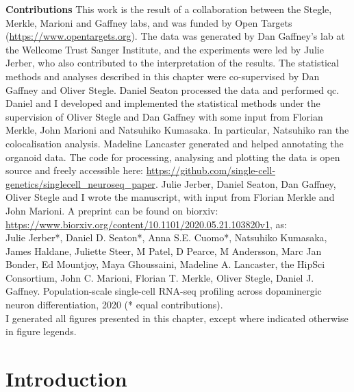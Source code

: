 \newpage

\begin{Comment2}

\hspace{-3mm}\textbf{Contributions} This work is the result of a collaboration between the Stegle, Merkle, Marioni and Gaffney labs, and was funded by Open Targets 
(\url{https://www.opentargets.org}).
The data was generated by Dan Gaffney’s lab at the Wellcome Trust Sanger Institute, and the experiments were led by Julie Jerber, who also contributed to the interpretation of the results. 
The statistical methods and analyses described in this chapter were co-supervised by Dan Gaffney and Oliver Stegle. 
Daniel Seaton processed the data and performed \gls{qc}. 
Daniel and I developed and implemented the statistical methods under the supervision of Oliver Stegle and Dan Gaffney with some input from Florian Merkle, John Marioni and Natsuhiko Kumasaka.
In particular, Natsuhiko ran the colocalisation analysis.
Madeline Lancaster generated and helped annotating the organoid data.
The code for processing, analysing and plotting the data is open source and freely accessible here: \url{https://github.com/single-cell-genetics/singlecell\_neuroseq\_paper}.
Julie Jerber, Daniel Seaton, Dan Gaffney, Oliver Stegle and I wrote the manuscript, with input from Florian Merkle and John Marioni.
A preprint \cite{jerber2020population} can be found on biorxiv: \url{https://www.biorxiv.org/content/10.1101/2020.05.21.103820v1}, as:\\

Julie Jerber*, Daniel D. Seaton*, Anna S.E. Cuomo*, Natsuhiko Kumasaka, James Haldane, Juliette Steer, M Patel, D Pearce, M Andersson, Marc Jan Bonder, Ed Mountjoy, Maya Ghoussaini, Madeline A. Lancaster, the HipSci Consortium, John C. Marioni, Florian T. Merkle, Oliver Stegle, Daniel J. Gaffney. Population-scale single-cell RNA-seq profiling across dopaminergic neuron differentiation, 2020 (* equal contributions). \\

I generated all figures presented in this chapter, except where indicated otherwise in figure legends. 

\end{Comment2}

\newpage

\section{Introduction}
\label{sec:neuroseq_intro}

